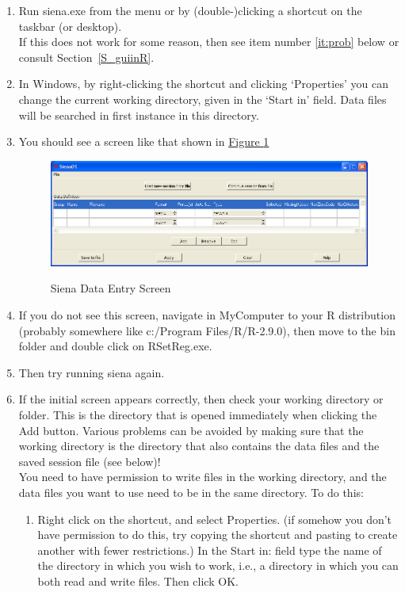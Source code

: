 \documentclass[a4paper,fleqn]{article}
\newcommand{\+}{\, + \,}
\newcommand{\sfn}[1]{\textsf{#1}}
\newcommand{\Rn}{{\sf R}}
\begin{document}
\begin{enumerate}
\item Run \sfn{siena.exe} from the menu or by (double-)clicking a shortcut on
  the taskbar (or desktop).\\
  If this does not work for some reason, then see item number \ref{it:prob}
  below or consult Section~\ref{S_guiinR}.
\item In Windows, by right-clicking the shortcut and clicking `Properties'
      you can change the current working directory, given in the
      `Start in' field. Data files will be searched in first instance
      in this directory.
\item You should see a screen like that shown in \hyperlink{siena1}{Figure
    \ref{fig:siena1}}
  \begin{figure}[ht]
    \begin{center}
      \includegraphics[width=\textwidth]{siena1.png}
\hypertarget{siena1}{}
    \end{center}
\caption{Siena Data Entry Screen}
\label{fig:siena1}
  \end{figure}
\item \label{it:prob} If you do not see this screen, navigate in MyComputer to your \Rn{}
  distribution (probably somewhere like \textsf{c:/Program Files/R/R-2.9.0}),
  then move to the \textsf{bin} folder and double click on \textsf{RSetReg.exe}.
\item Then try running siena again.
\item If the initial screen appears correctly, then check your working directory
  or folder. This is
  the directory that is opened immediately when clicking the \textsf{Add} button.
  Various problems can be avoided by making sure that the working directory
  is the directory that also contains the data files and the saved session file
  (see below)!\\
  You need to have permission to write files in the working directory,
  and the data files you want to use need to be in the same directory. To
  do this:
\begin{enumerate}
\item Right click on the shortcut, and select Properties. (if somehow you
don't have permission to do this, try copying the shortcut and pasting
to create another with fewer restrictions.)  In the \textsf{Start in:} field
type the name of the directory in which you wish to work, i.e., a
directory in which you can both read and write files. Then click OK.


\end{enumerate}
\end{enumerate}
\end{document}
